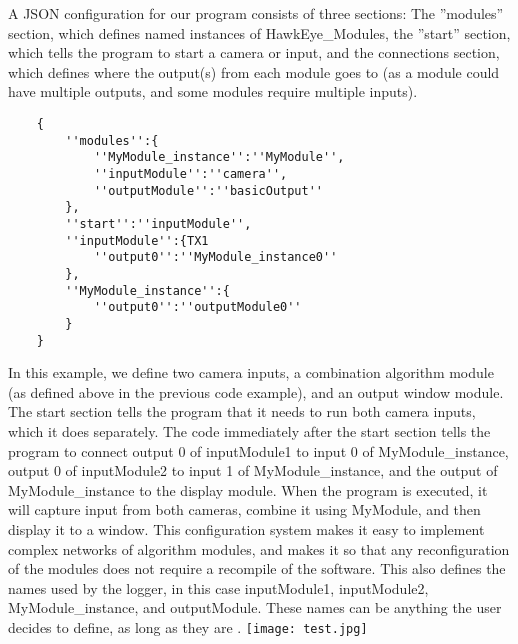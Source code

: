\documentclass[letterpaper,10pt,titlepage]{IEEEtran}
\begin{document}
\par
A JSON configuration for our program consists of three sections: The ''modules'' section, which defines named instances of HawkEye\_Modules, the ''start'' section, which tells the program to start a camera or input, and the connections section, which defines where the output(s) from each module goes to (as a module could have multiple outputs, and some modules require multiple inputs).\\
   \begin{lstlisting}
   	{
		''modules'':{
			''MyModule_instance'':''MyModule'',
			''inputModule'':''camera'',
			''outputModule'':''basicOutput''
		},
		''start'':''inputModule'',
		''inputModule'':{TX1
			''output0'':''MyModule_instance0''
		},
		''MyModule_instance'':{
			''output0'':''outputModule0''
		}
	}
   \end{lstlisting}
 \par 
   In this example, we define two camera inputs, a combination algorithm module (as defined above in the previous code example), and an output window module. The start section tells the program that it needs to run both camera inputs, which it does separately. The code immediately after the start section tells the program to connect output 0 of inputModule1 to input 0 of MyModule\_instance, output 0 of inputModule2 to input 1 of MyModule\_instance, and the output of MyModule\_instance to the display module. When the program is executed, it will capture input from both cameras, combine it using MyModule, and then display it to a window. This configuration system makes it easy to implement complex networks of algorithm modules, and makes it so that any reconfiguration of the modules does not require a recompile of the software. This also defines the names used by the logger, in this case inputModule1, inputModule2, MyModule\_instance, and outputModule. These names can be anything the user decides to define, as long as they are .
	 \texttt{[image: test.jpg]}

   
\end{document}
